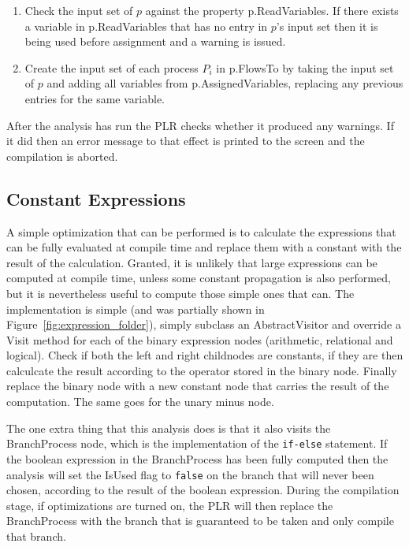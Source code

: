   	\begin{enumerate}
  		\item Check the input set of $p$ against the property 
  		\textsf{p.ReadVariables}. If there exists a variable in 
  		\textsf{p.ReadVariables} that has no entry in $p$'s input set then it is 
  		being used before assignment and a warning is issued.
  		
  		\item Create the input set of each process $P_i$ in \textsf{p.FlowsTo} 
  		by taking the input set of $p$ and adding all variables from 
  		\textsf{p.AssignedVariables}, replacing any previous entries for the 
  		same variable.
  	
  	\end{enumerate}
  	
  After the analysis has run the PLR checks whether it produced any warnings. 
  If it did then an error message to that effect is printed to the screen and 
  the compilation is aborted.
	

\subsection{Constant Expressions}

	A simple optimization that can be performed is to calculate the expressions 
	that can be fully evaluated at compile time and replace them with a constant 
	with the result of the calculation. Granted, it is unlikely that large 
	expressions can be computed at compile time, unless some constant 
	propagation is also performed, but it is nevertheless useful to compute 
	those simple ones that can. The implementation is simple (and was partially 
	shown in Figure~\ref{fig:expression_folder}), simply subclass an 
	\textsf{AbstractVisitor} and override a \textsf{Visit} method for each of 
	the binary expression nodes (arithmetic, relational and logical). Check if 
	both the left and right childnodes are constants, if they are then 
	calculcate the result according to the operator stored in the binary node. 
	Finally replace the binary node with a new constant node that carries the 
	result of the computation. The same goes for the unary minus node.
	
	The one extra thing that this analysis does is that it also visits the
	\textsf{BranchProcess} node, which is the implementation of the
	\texttt{if-else} statement. If the boolean expression in the 
	\textsf{BranchProcess} has been fully computed then the analysis will set 
	the \textsf{IsUsed} flag to \texttt{false} on the branch that will never 
	been chosen, according to the result of the boolean expression. During the 
	compilation stage, if optimizations are turned on, the PLR will then replace 
	the \textsf{BranchProcess} with the branch that is guaranteed to be taken 
	and only compile that branch.

